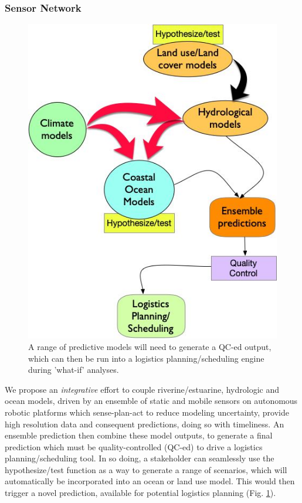 \subsubsection*{Sensor Network}


\begin{figure}
  \centering
  \includegraphics[scale=0.30]{fig/process.jpg}
  \caption{A range of predictive models will need to generate a QC-ed
    output, which can then be run into a logistics planning/scheduling
    engine during 'what-if' analyses.}
  \label{fig:process}
\end{figure}

We propose an \emph{integrative} effort to couple riverine/estuarine,
hydrologic and ocean models, driven by an ensemble of static and
mobile sensors on autonomous robotic platforms which sense-plan-act to
reduce modeling uncertainty, provide high resolution data and
consequent predictions, doing so with timeliness. An ensemble
prediction then combine these model outputs, to generate a final
prediction which must be quality-controlled (QC-ed) to drive a
logistics planning/scheduling tool. In so doing, a stakeholder can
seamlessly use the hypothesize/test function as a way to generate a
range of scenarios, which will automatically be incorporated into an
ocean or land use model. This would then trigger a novel prediction,
available for potential logistics planning (Fig. \ref{fig:process}).

